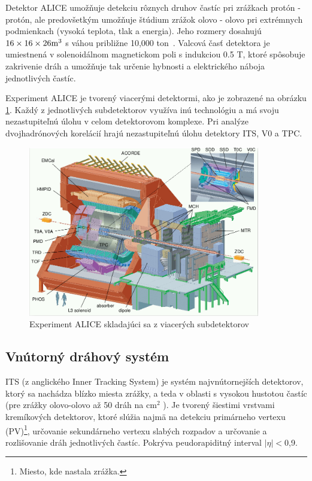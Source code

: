 \documentclass[thesismargins, thesislinespacing]{rnthesis}
\begin{document}
Detektor  ALICE umožňuje detekciu rôznych druhov častíc pri zrážkach protón - protón, ale predovšetkým umožňuje štúdium zrážok olovo - olovo pri extrémnych podmienkach (vysoká teplota, tlak a energia). Jeho rozmery dosahujú $16\times 16\times26 \rm{m^3}$ s váhou približne 10,000 ton~\cite{alice}. Valcová časť detektora je umiestnená v solenoidálnom magnetickom poli s indukciou 0.5 T, ktoré spôsobuje zakrivenie dráh a umožňuje tak určenie hybnosti a elektrického náboja jednotlivých častíc.

Experiment ALICE je tvorený viacerými detektormi, ako je zobrazené na obrázku \ref{ALICE}. Každý z jednotlivých subdetektorov využíva inú technológiu a má svoju nezastupiteľnú úlohu v celom detektorovom komplexe. Pri analýze dvojhadrónových korelácií hrajú nezastupiteľnú úlohu detektory ITS, V0 a TPC.

\begin{figure}[hbtp!]
	\begin{center}
		\includegraphics[width=0.9\textwidth]{./Obrazky_praca/ALICE.png}
		\caption{Experiment ALICE skladajúci sa z viacerých subdetektorov~\cite{aliceDetektor}}
		\label{ALICE}
	\end{center}
\end{figure}

\subsection{Vnútorný dráhový systém}

ITS (z anglického Inner Tracking System) je systém najvnútornejších detektorov, ktorý sa nachádza blízko miesta zrážky, a teda v oblasti s vysokou hustotou častíc (pre zrážky olovo-olovo až 50 dráh na $\mathrm{cm}^2$ ). Je tvorený šiestimi vrstvami kremíkových detektorov, ktoré slúžia najmä na detekciu primárneho vertexu (PV)\footnote{Miesto, kde nastala zrážka.}, určovanie sekundárneho vertexu slabých rozpadov a určovanie a rozlišovanie dráh jednotlivých častíc. Pokrýva peudorapiditný interval $|\eta|<$0,9.
\end{document}
